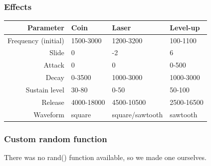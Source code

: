 \subsubsection{Effects}

\begin{table}[ht!]
    \begin{center}
    \begin{tabular}{r|lll}
    Parameter           & Coin       & Laser           & Level-up   \\
    \hline
    Frequency (initial) & 1500-3000  & 1200-3200       & 100-1100   \\
    Slide               & 0          & -2              & 6          \\
    Attack              & 0          & 0               & 0-500      \\
    Decay               & 0-3500     & 1000-3000       & 1000-3000  \\
    Sustain level       & 30-80      & 0-50            & 50-100     \\
    Release             & 4000-18000 & 4500-10500      & 2500-16500 \\
    Waveform            & square     & square/sawtooth & sawtooth   \\
    \end{tabular}
    \end{center}
\end{table}


\subsubsection{Custom random function}

There was no rand() function available, so we made one ourselves.
